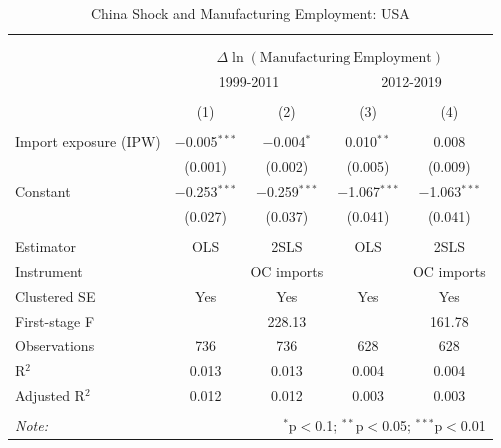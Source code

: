
\begin{table}[!htbp] \centering 
  \caption{China Shock and Manufacturing Employment: USA} 
  \label{tab:usa_china_mfg} 
\begin{tabular}{@{\extracolsep{5pt}}lcccc} 
\\[-1.8ex]\hline 
\hline \\[-1.8ex] 
\\[-1.8ex] & \multicolumn{4}{c}{$\Delta \ln(\mathrm{Manufacturing\ Employment})$} \\ 
 & \multicolumn{2}{c}{1999-2011} & \multicolumn{2}{c}{2012-2019} \\ 
\\[-1.8ex] & (1) & (2) & (3) & (4)\\ 
\hline \\[-1.8ex] 
 Import exposure (IPW) & $-$0.005$^{***}$ & $-$0.004$^{*}$ & 0.010$^{**}$ & 0.008 \\ 
  & (0.001) & (0.002) & (0.005) & (0.009) \\ 
  Constant & $-$0.253$^{***}$ & $-$0.259$^{***}$ & $-$1.067$^{***}$ & $-$1.063$^{***}$ \\ 
  & (0.027) & (0.037) & (0.041) & (0.041) \\ 
 \hline \\[-1.8ex] 
Estimator & OLS & 2SLS & OLS & 2SLS \\ 
Instrument &  & OC imports &  & OC imports \\ 
Clustered SE & Yes & Yes & Yes & Yes \\ 
First-stage F &  & 228.13 &  & 161.78 \\ 
Observations & 736 & 736 & 628 & 628 \\ 
R$^{2}$ & 0.013 & 0.013 & 0.004 & 0.004 \\ 
Adjusted R$^{2}$ & 0.012 & 0.012 & 0.003 & 0.003 \\ 
\hline 
\hline \\[-1.8ex] 
\textit{Note:}  & \multicolumn{4}{r}{$^{*}$p$<$0.1; $^{**}$p$<$0.05; $^{***}$p$<$0.01} \\ 
\end{tabular} 
\end{table} 

